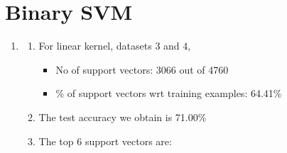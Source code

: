 \documentclass[12pt]{article}
\begin{document}
\clearpage

\section{Binary SVM}

\begin{enumerate}[label=(\alph*)]
    \item \begin{enumerate}[label=\roman*.]
              \item For linear kernel, datasets 3 and 4,
                    \begin{itemize}
                        \item No of support vectors: 3066 out of 4760
                        \item \% of support vectors wrt training examples: 64.41\%
                    \end{itemize}
              \item The test accuracy we obtain is 71.00\%
              \item The top 6 support vectors are:


\end{enumerate}
\end{enumerate}
\end{document}
